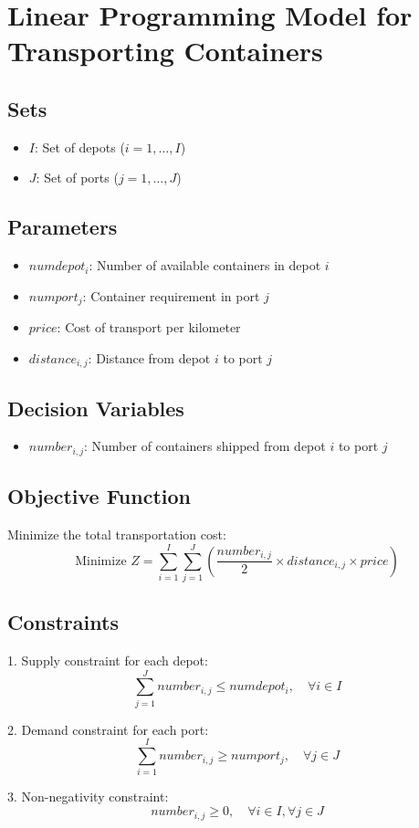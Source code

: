 \documentclass{article}
\begin{document}
\section*{Linear Programming Model for Transporting Containers}

\subsection*{Sets}
\begin{itemize}
    \item $I$: Set of depots ($i = 1, \ldots, I$)
    \item $J$: Set of ports ($j = 1, \ldots, J$)
\end{itemize}

\subsection*{Parameters}
\begin{itemize}
    \item $numdepot_i$: Number of available containers in depot $i$
    \item $numport_j$: Container requirement in port $j$
    \item $price$: Cost of transport per kilometer
    \item $distance_{i,j}$: Distance from depot $i$ to port $j$
\end{itemize}

\subsection*{Decision Variables}
\begin{itemize}
    \item $number_{i,j}$: Number of containers shipped from depot $i$ to port $j$
\end{itemize}

\subsection*{Objective Function}
Minimize the total transportation cost:
\[
\text{Minimize } Z = \sum_{i=1}^{I} \sum_{j=1}^{J} \left( \frac{number_{i,j}}{2} \times distance_{i,j} \times price \right)
\]

\subsection*{Constraints}

1. Supply constraint for each depot:
\[
\sum_{j=1}^{J} number_{i,j} \leq numdepot_i, \quad \forall i \in I
\]

2. Demand constraint for each port:
\[
\sum_{i=1}^{I} number_{i,j} \geq numport_j, \quad \forall j \in J
\]

3. Non-negativity constraint:
\[
number_{i,j} \geq 0, \quad \forall i \in I, \forall j \in J
\]
\end{document}

